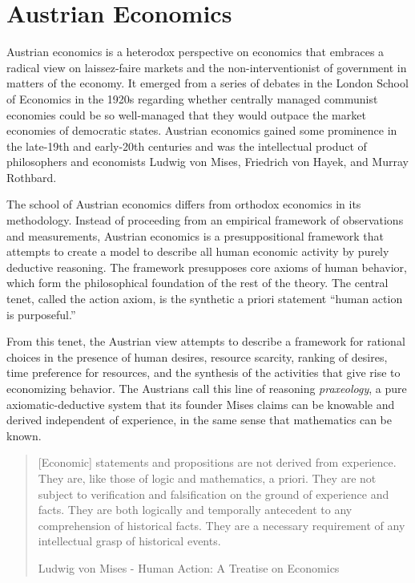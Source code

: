 
\section{Austrian Economics}

Austrian economics is a heterodox perspective on economics that embraces a
radical view on laissez-faire markets and the non-interventionist of government
in matters of the economy. It emerged from a series of debates in the London
School of Economics in the 1920s regarding whether centrally managed communist
economies could be so well-managed that they would outpace the market economies
of democratic states. Austrian economics gained some prominence in the late-19th
and early-20th centuries and was the intellectual product of philosophers and
economists Ludwig von Mises, Friedrich von Hayek, and Murray Rothbard.


The school of Austrian economics differs from orthodox economics in its
methodology. Instead of proceeding from an empirical framework of observations
and measurements, Austrian economics is a presuppositional framework that
attempts to create a model to describe all human economic activity by purely
deductive reasoning. The framework presupposes core axioms of human behavior,
which form the philosophical foundation of the rest of the theory. The central
tenet, called the action axiom, is the synthetic a priori statement ``human
action is purposeful.''

From this tenet, the Austrian view attempts to describe a framework for rational
choices in the presence of human desires, resource scarcity, ranking of desires,
time preference for resources, and the synthesis of the activities that give
rise to economizing behavior. The Austrians call this line of reasoning
\textit{praxeology}, a pure axiomatic-deductive system that its founder Mises
claims can be knowable and derived independent of experience, in the same sense
that mathematics can be known.


\begin{quote}
{[}Economic{]} statements and propositions are not derived from
experience. They are, like those of logic and mathematics, a priori.
They are not subject to verification and falsification on the ground of
experience and facts. They are both logically and temporally antecedent
to any comprehension of historical facts. They are a necessary
requirement of any intellectual grasp of historical events.

\begin{flushright}
Ludwig von Mises - Human Action: A Treatise on Economics
\end{flushright}
\end{quote}

